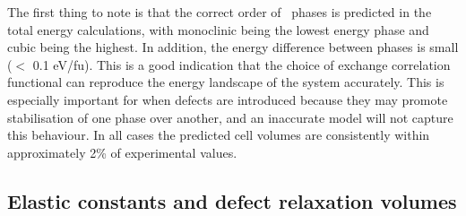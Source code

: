 The first thing to note is that the correct order of \zirconia\ phases is predicted in the total energy calculations, with monoclinic being the lowest energy phase and cubic being the highest. In addition, the energy difference between phases is small ($<$ 0.1 eV/fu). This is a good indication that the choice of exchange correlation functional can reproduce the energy landscape of the system accurately. This is especially important for when defects are introduced because they may promote stabilisation of one phase over another, and an inaccurate model will not capture this behaviour. In all cases the predicted cell volumes are consistently within approximately 2\% of experimental values. 

\begin{table}[ht] %
\onehalfspacing
\centering
\caption[Calculated unit cell parameters for the different crystal structures of \zirconia . Experimental data for pure monoclinic, yttria-stabilised tetragonal and magnesia-stabilised cubic phases at 295 K are shown in parentheses. Energy difference between structures is shown with respect to the cubic phase.]{Calculated unit cell parameters for the different crystal structures of \zirconia . Experimental data for monoclinic, tetragonal and cubic phases at 295 K are shown in parentheses \cite{Howard1988}. Energy difference between structures is shown with respect to the cubic phase.}
\label{lattice_params}
\end{table}

\subsection{Elastic constants and defect relaxation volumes}

